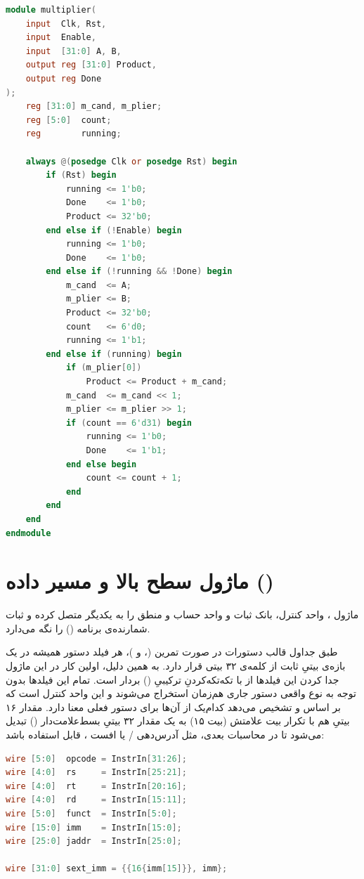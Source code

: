 \begin{latin}
    \begin{lstlisting}[language=Verilog]
module multiplier(
    input  Clk, Rst,
    input  Enable,
    input  [31:0] A, B,
    output reg [31:0] Product,
    output reg Done
);
    reg [31:0] m_cand, m_plier;
    reg [5:0]  count;
    reg        running;

    always @(posedge Clk or posedge Rst) begin
        if (Rst) begin
            running <= 1'b0;
            Done    <= 1'b0;
            Product <= 32'b0;
        end else if (!Enable) begin
            running <= 1'b0;
            Done    <= 1'b0;
        end else if (!running && !Done) begin
            m_cand  <= A;
            m_plier <= B;
            Product <= 32'b0;
            count   <= 6'd0;
            running <= 1'b1;
        end else if (running) begin
            if (m_plier[0])
                Product <= Product + m_cand;
            m_cand  <= m_cand << 1;
            m_plier <= m_plier >> 1;
            if (count == 6'd31) begin
                running <= 1'b0;
                Done    <= 1'b1;
            end else begin
                count <= count + 1;
            end
        end
    end
endmodule
    \end{lstlisting}
\end{latin}

\section{ماژول سطح بالا و مسیر داده ()}
ماژول ، واحد کنترل، بانک ثبات و واحد حساب و منطق را به یکدیگر متصل کرده و ثبات شمارنده‌ی برنامه () را نگه می‌دارد.

طبق جداول قالب دستورات در صورت تمرین (،  و )، هر فیلد دستور همیشه در یک بازه‌ی بیتیِ ثابت از کلمه‌ی ۳۲ بیتی قرار دارد. به همین دلیل، اولین کار در این ماژول جدا کردن این فیلدها از  با تکه‌تکه‌کردنِ ترکیبیِ () بردار است. تمام این فیلدها بدون توجه به نوع واقعی دستور جاری هم‌زمان استخراج می‌شوند و این واحد کنترل است که بر اساس  و  تشخیص می‌دهد کدام‌یک از آن‌ها برای دستور فعلی معنا دارد. مقدار ۱۶ بیتیِ  هم با تکرار بیت علامتش (بیت ۱۵) به یک مقدار ۳۲ بیتیِ بسط‌علامت‌دار () تبدیل می‌شود تا در محاسبات بعدی، مثل آدرس‌دهی / یا افست ، قابل استفاده باشد:

\begin{latin}
    \begin{lstlisting}[language=Verilog]
wire [5:0]  opcode = InstrIn[31:26];
wire [4:0]  rs     = InstrIn[25:21];
wire [4:0]  rt     = InstrIn[20:16];
wire [4:0]  rd     = InstrIn[15:11];
wire [5:0]  funct  = InstrIn[5:0];
wire [15:0] imm    = InstrIn[15:0];
wire [25:0] jaddr  = InstrIn[25:0];

wire [31:0] sext_imm = {{16{imm[15]}}, imm};
    \end{lstlisting}
\end{latin}

